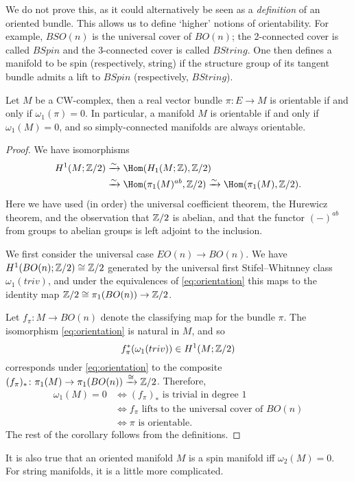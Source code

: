 \documentclass[ma3408.tex]{subfiles}
\begin{document}
\begin{Rem}
We do not prove this, as it could alternatively be seen as a \emph{definition} of an oriented bundle. This allows us to define `higher' notions of orientability. For example, $BSO(n)$ is the universal cover of $BO(n)$; the 2-connected cover is called $BSpin$ and the 3-connected cover is called $BString$. One then defines a manifold to be spin (respectively, string) if the structure group of its tangent bundle admits a lift to $BSpin$ (respectively, $BString$). 
\end{Rem}
\begin{Cor}\label{cor:sw-classes-orientation}
Let $M$ be a CW-complex, then a real vector bundle $\pi \colon E \to M$ is orientable if and only if $\omega_1(\pi) = 0$. In particular, a manifold $M$ is orientable if and only if $\omega_1(M) = 0$, and so simply-connected manifolds are always orientable. 
\end{Cor}
\begin{proof}
We have isomorphisms
\begin{equation}\label{eq:orientation}
\begin{split}
H^1(M;\bbZ/2) &\xrightarrow{\sim} \Hom(H_1(M;\bbZ),\bbZ/2)  \\
&\xrightarrow{\sim} \Hom(\pi_1(M)^{ab},\bbZ/2) 
\xrightarrow{\sim}  \Hom(\pi_1(M),\bbZ/2).
\end{split}
\end{equation}
Here we have used (in order) the universal coefficient theorem, the Hurewicz theorem, and the observation that $\mathbb{Z}/2$ is abelian, and that the functor $(-)^{ab}$ from groups to abelian groups is left adjoint to the inclusion. 

We first consider the universal case $EO(n) \to BO(n)$. We have $H^1(BO(n);\mathbb{Z}/2) \cong \mathbb{Z}/2$ generated by the universal first Stifel--Whitnney class $\omega_1(triv)$, and under the equivalences of \eqref{eq:orientation} this maps to the identity map $\mathbb{Z}/2 \cong \pi_1(BO(n)) \to \mathbb{Z}/2$.

Let $f_{\pi} \colon M\to BO(n)$ denote the classifying map for the bundle $\pi$. The isomorphism \eqref{eq:orientation} is natural in $M$, and so 
\[
f_{\pi}^*(\omega_1(triv)) \in H^1(M;\mathbb{Z}/2)
\]
corresponds under \eqref{eq:orientation} to the composite $(f_{\pi})_* \colon \pi_1(M) \to \pi_1(BO(n))  \xrightarrow{\cong} \mathbb{Z}/2$. Therefore,
\begin{align*}
\omega_1(M) = 0 & \iff (f_{\pi})_* \text{ is trivial in degree } 1 \\
& \iff f_{\pi} \text{ lifts to the universal cover of } BO(n) \\
& \iff \pi \text{ is orientable.    }
\end{align*}
 The rest of the corollary follows from the definitions. 
\end{proof}
\begin{Rem}
It is also true that an oriented manifold $M$ is a spin manifold iff $\omega_2(M) = 0$. For string manifolds, it is a little more complicated. 
\end{Rem}
\end{document}
